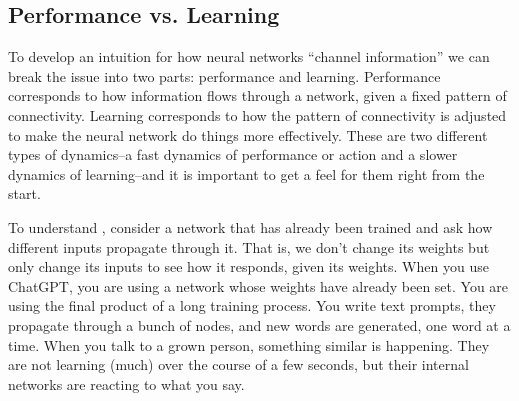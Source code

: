 \subsection{Performance vs. Learning}


To develop an intuition for how neural networks ``channel information'' we can break the issue into two parts: performance and learning. Performance corresponds to how information flows through a network, given a fixed pattern of connectivity.  Learning corresponds to how the pattern of connectivity is adjusted to make the neural network do things more effectively. These are two different types of dynamics--a fast dynamics of performance or action and a slower dynamics of learning--and it is important to get a feel for them right from the start.
 
To understand , consider a network that has already been trained and ask how different inputs propagate through it. That is, we don't change its weights but only change its inputs to see how it responds, given its weights. When you use ChatGPT, you are using a network whose weights have already been set. You are using the final product of a long training process. You write text prompts, they propagate through a bunch of nodes, and new words are generated, one word at a time.  When you talk to a grown person, something similar is happening. They are not learning (much) over the course of a few seconds, but their internal networks are reacting to what you say.  

